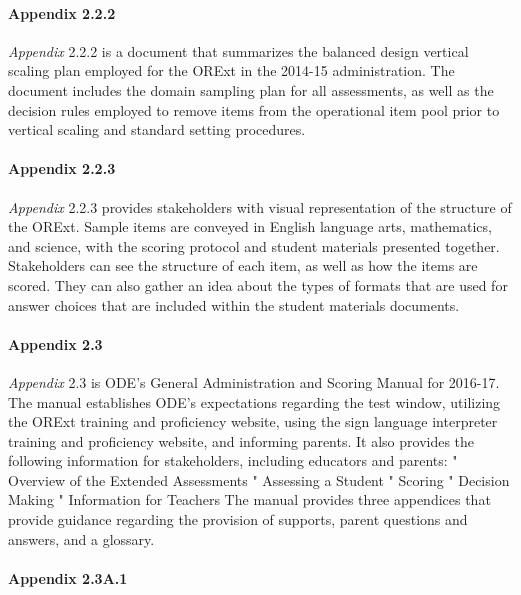 \documentclass[]{article}
\let\oldparagraph\paragraph
\renewcommand{\paragraph}[1]{\oldparagraph{#1}\mbox{}}
\begin{document}
\paragraph{Appendix 2.2.2}\label{appendix-2.2.2}

\emph{Appendix} 2.2.2 is a document that summarizes the balanced design
vertical scaling plan employed for the ORExt in the 2014-15
administration. The document includes the domain sampling plan for all
assessments, as well as the decision rules employed to remove items from
the operational item pool prior to vertical scaling and standard setting
procedures.

\paragraph{Appendix 2.2.3}\label{appendix-2.2.3}

\emph{Appendix} 2.2.3 provides stakeholders with visual representation
of the structure of the ORExt. Sample items are conveyed in English
language arts, mathematics, and science, with the scoring protocol and
student materials presented together. Stakeholders can see the structure
of each item, as well as how the items are scored. They can also gather
an idea about the types of formats that are used for answer choices that
are included within the student materials documents.

\paragraph{Appendix 2.3}\label{appendix-2.3}

\emph{Appendix} 2.3 is ODE's General Administration and Scoring Manual
for 2016-17. The manual establishes ODE's expectations regarding the
test window, utilizing the ORExt training and proficiency website, using
the sign language interpreter training and proficiency website, and
informing parents. It also provides the following information for
stakeholders, including educators and parents: " Overview of the
Extended Assessments " Assessing a Student " Scoring " Decision Making "
Information for Teachers The manual provides three appendices that
provide guidance regarding the provision of supports, parent questions
and answers, and a glossary.

\paragraph{Appendix 2.3A.1}\label{appendix-2.3a.1}
\end{document}
